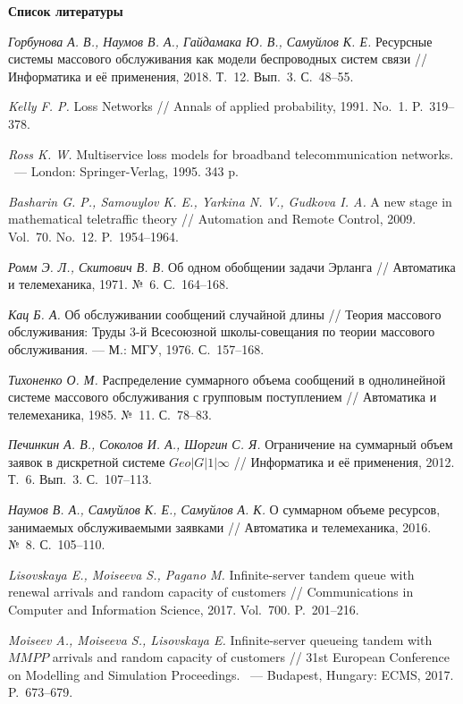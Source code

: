 \documentclass[a4paper,12pt]{article}
\begin{document}
\noindent\textbf{Список литературы}
\begin{enumerate}

\textit{Горбунова А. В., Наумов В. А., Гайдамака Ю. В., Самуйлов К. Е.}
Ресурсные системы массового обслуживания как модели беспроводных систем связи // {Информатика и её применения}, 2018. Т.~12. Вып.~3. С.~48--55.

\textit{Kelly F. P.}
Loss Networks // {Annals of applied probability}, 1991. No.~1. P.~319--378.

\textit{Ross K. W.}
Multiservice loss models for broadband telecommunication networks. ~--- {London: Springer-Verlag}, 1995. 343 p.

\textit{Basharin G. P., Samouylov K. E., Yarkina N. V., Gudkova I. A.}
A new stage in mathematical teletraffic theory // {Automation and Remote Control}, 2009. Vol.~70. No.~12. P.~1954--1964.

\textit{Ромм Э. Л., Скитович В. В.}
Об одном обобщении задачи Эрланга // {Автоматика и телемеханика}, 1971. №~6. С.~164--168.

\textit{Кац Б. А.}
Об обслуживании сообщений случайной длины // {Теория массового обслуживания: Труды 3-й Всесоюзной школы-совещания по теории массового обслуживания}. --- М.: МГУ, 1976. С.~157--168.

\textit{Тихоненко О. М.}
Распределение суммарного объема сообщений в однолинейной системе массового обслуживания с групповым поступлением // {Автоматика и телемеханика}, 1985. №~11. С.~78--83.

\textit{Печинкин А. В., Соколов И. А., Шоргин С. Я.}
Ограничение на суммарный объем заявок в дискретной системе $Geo|G|1|\infty$ // {Информатика и её применения}, 2012. Т.~6. Вып.~3. С.~107--113.

\textit{Наумов В. А., Самуйлов К. Е., Самуйлов А. К.}
О суммарном объеме ресурсов, занимаемых обслуживаемыми заявками // {Автоматика и телемеханика}, 2016. №~8. С.~105--110.

\textit{Lisovskaya E., Moiseeva S., Pagano M.}
Infinite-server tandem queue with renewal arrivals and random capacity of customers // {Communications in Computer and Information Science}, 2017. Vol.~700. P.~201--216.

\textit{Moiseev A., Moiseeva S., Lisovskaya E.}
Infinite-server queueing tandem with $MMPP$ arrivals and random capacity of customers // {31st European Conference on Modelling and Simulation Proceedings}. ~--- Budapest, Hungary: ECMS, 2017. P.~673--679.


\end{enumerate}
\end{document}
